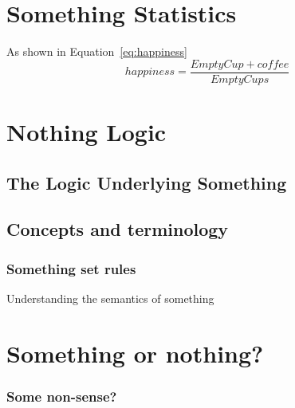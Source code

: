 \section{Something Statistics}
\label{sec:somestatistics}
	
As shown in Equation~\ref{eq:happiness}
\begin{equation}\label{eq:happiness}
	happiness=\frac{EmptyCup+coffee}{EmptyCups}
\end{equation}	
	
	
\section{Nothing Logic}
\label{sec:notlogic}
	
\subsection{The Logic Underlying Something}
\label{subsec:logicunderlying}
    	
    	
    	
\subsection{Concepts and terminology}
\label{subsec:conceptsterm}	
		
\subsubsection*{Something set rules} 

Understanding the semantics of something

\section{Something or nothing?}
\label{sec:someornot}

\subsubsection*{Some non-sense?}

    	
    	
    	
    